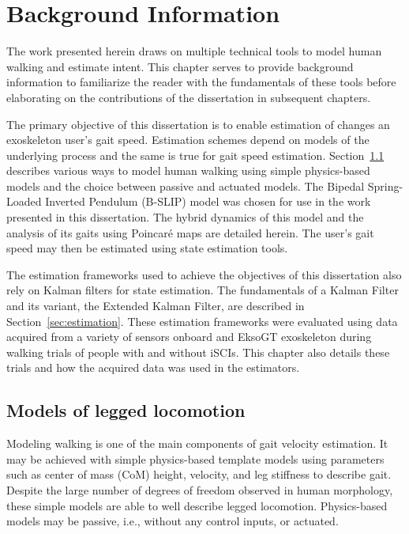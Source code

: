 \chapter{Background Information}\label{chapter:bg_info}

The work presented herein draws on multiple technical tools to model human walking and estimate intent. This chapter serves to provide background information to familiarize the reader with the fundamentals of these tools before elaborating on the contributions of the dissertation in subsequent chapters. 

The primary objective of this dissertation is to enable estimation of changes an exoskeleton user's gait speed. Estimation schemes depend on models of the underlying process and the same is true for gait speed estimation. Section~\ref{sec:walking_models} describes various ways to model human walking using simple physics-based models and the choice between passive and actuated models. The Bipedal Spring-Loaded Inverted Pendulum (B-SLIP) model was chosen for use in the work presented in this dissertation. The hybrid dynamics of this model and the analysis of its gaits using Poincar\'e maps are detailed herein. The user's gait speed may then be estimated using state estimation tools.

The estimation frameworks used to achieve the objectives of this dissertation also rely on Kalman filters for state estimation. The fundamentals of a Kalman Filter and its variant, the Extended Kalman Filter, are described in Section~\ref{sec:estimation}. These estimation frameworks were evaluated using data acquired from a variety of sensors onboard and EksoGT exoskeleton during walking trials of people with and without iSCIs. This chapter also details these trials and how the acquired data was used in the estimators.

\section{Models of legged locomotion}\label{sec:walking_models}

Modeling walking is one of the main components of gait velocity estimation. It may be achieved with simple physics-based template models using parameters such as center of mass (CoM) height, velocity, and leg stiffness to describe gait. Despite the large number of degrees of freedom observed in human morphology, these simple models are able to well describe legged locomotion. Physics-based models may be passive, i.e., without any control inputs, or actuated.  

